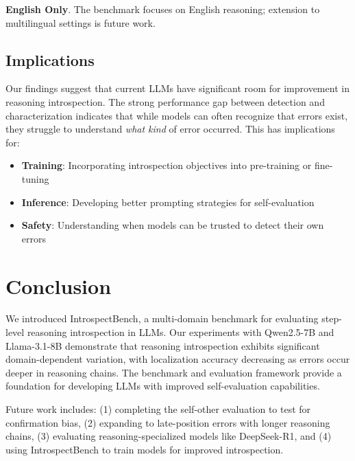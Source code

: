 \documentclass{article}
\begin{document}
\textbf{English Only}. The benchmark focuses on English reasoning; extension to multilingual settings is future work.

\subsection{Implications}

Our findings suggest that current LLMs have significant room for improvement in reasoning introspection. The strong performance gap between detection and characterization indicates that while models can often recognize that errors exist, they struggle to understand \textit{what kind} of error occurred. This has implications for:

\begin{itemize}
    \item \textbf{Training}: Incorporating introspection objectives into pre-training or fine-tuning
    \item \textbf{Inference}: Developing better prompting strategies for self-evaluation
    \item \textbf{Safety}: Understanding when models can be trusted to detect their own errors
\end{itemize}

\section{Conclusion}

We introduced IntrospectBench, a multi-domain benchmark for evaluating step-level reasoning introspection in LLMs. Our experiments with Qwen2.5-7B and Llama-3.1-8B demonstrate that reasoning introspection exhibits significant domain-dependent variation, with localization accuracy decreasing as errors occur deeper in reasoning chains. The benchmark and evaluation framework provide a foundation for developing LLMs with improved self-evaluation capabilities.

Future work includes: (1) completing the self-other evaluation to test for confirmation bias, (2) expanding to late-position errors with longer reasoning chains, (3) evaluating reasoning-specialized models like DeepSeek-R1, and (4) using IntrospectBench to train models for improved introspection.
\end{document}
